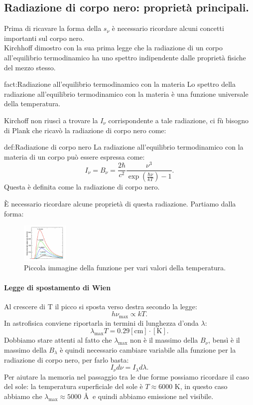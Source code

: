 \subsection{Radiazione di corpo nero: proprietà principali.}%
Prima di ricavare la forma della $s_{\nu} $ è necessario ricordare alcuni concetti importanti sul corpo nero.\\
Kirchhoff dimostro con la sua prima legge che la radiazione di un corpo all'equilibrio termodinamico ha uno spettro indipendente dalle proprietà fisiche del mezzo stesso.
\begin{fact}{fact:Radiazione all'equilibrio termodinamico con la materia}
	Lo spettro della radiazione all'equilibrio termodinamico con la materia è una funzione universale della temperatura.
\end{fact}
Kirchoff non riuscì a trovare la $I_{\nu} $ corrispondente a tale radiazione, ci fù bisogno di Plank che ricavò la radiazione di corpo nero come:
\begin{defn}{def:Radiazione di corpo nero}
	La radiazione all'equilibrio termodinamico con la materia di un corpo può essere espressa come:
	\[
		I_{\nu} = B_{\nu} = \frac{2\hbar }{c^2} \frac{\nu ^3}{\exp\left( \frac{\hbar\nu }{kT} \right) -1}
	.\] 
	Questa è definita come la radiazione di corpo nero.
\end{defn}
È necessario ricordare alcune proprietà di questa radiazione. Partiamo dalla forma:
\begin{figure}[H]
	\centering
	\includegraphics[width=0.2\textwidth]{figures/plank.png}
	\caption{\scriptsize Piccola immagine della funzione per vari valori della temperatura.}
	\label{fig:figures-plank-png}
\end{figure}
\paragraph{Legge di spostamento di Wien}
Al crescere di T il picco si sposta verso destra secondo la legge:
\[
	h \nu _{\text{max}} \propto kT
.\] 
In astrofisica conviene riportarla in termini di lunghezza d'onda $\lambda$:
\[
	\lambda _{\text{max}}T = 0.29 \left[ \text{cm} \right]\cdot  \left[ \text{K} \right] 
.\] 
Dobbiamo stare attenti al fatto che $\lambda _{\text{max}}$ non è il massimo della $B_{\nu} $, bensì è il massimo della $B_{\lambda} $ è quindi necessario cambiare variabile alla funzione per la radiazione di corpo nero, per farlo basta:
\[
	I_{\nu} d\nu = I_{\lambda } d\lambda 
.\] 
Per aiutare la memoria nel passaggio tra le due forme possiamo ricordare il caso del sole: la temperatura superficiale del sole è $T \approx 6000$ K, in questo caso abbiamo che  $\lambda _{\text{max}} \approx 5000$ \AA $ \ $ e quindi abbiamo emissione nel visibile.

